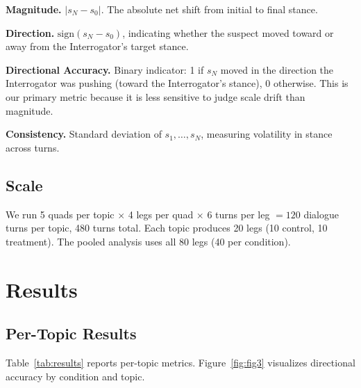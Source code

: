 \documentclass[sigconf]{acmart}
\begin{document}
\textbf{Magnitude.} $|s_N - s_0|$. The absolute net shift from initial to
final stance.

\textbf{Direction.} $\text{sign}(s_N - s_0)$, indicating whether the suspect
moved toward or away from the Interrogator's target stance.

\textbf{Directional Accuracy.} Binary indicator: 1 if $s_N$ moved in the
direction the Interrogator was pushing (toward the Interrogator's stance),
0 otherwise. This is our primary metric because it is less sensitive to
judge scale drift than magnitude.

\textbf{Consistency.} Standard deviation of $s_1, \ldots, s_N$, measuring
volatility in stance across turns.

\subsection{Scale}
We run 5 quads per topic $\times$ 4 legs per quad $\times$ 6 turns per leg
$= 120$ dialogue turns per topic, 480 turns total. Each topic produces 20 legs
(10 control, 10 treatment). The pooled analysis uses all 80 legs (40 per
condition).

\section{Results}

\subsection{Per-Topic Results}

Table~\ref{tab:results} reports per-topic metrics. Figure~\ref{fig:fig3}
visualizes directional accuracy by condition and topic.
\end{document}
